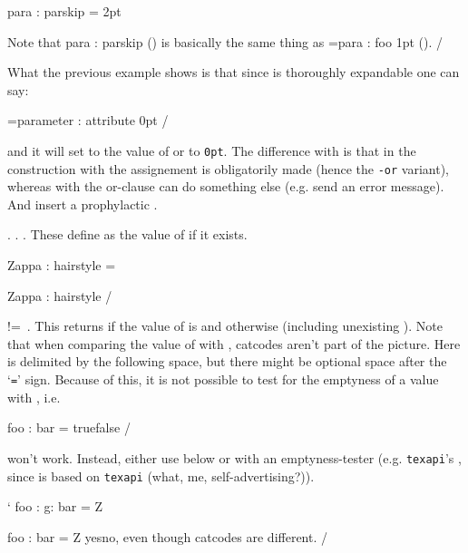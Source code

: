 \Example
\setparameter para  : parskip = 2pt \par
Note that 
\settovalueor\parskip para : parskip
                      {\parskip=1pt\relax}
(\the\parskip) is basically the same thing as
\parskip=\usevalueor para : foo {1pt\relax}
(\the\parskip).
\Example/

What the previous example shows is that since \com\usevalue
is thoroughly expandable one can say:

\example
\mydimen=\usevalueor parameter : attribute {0pt}
\example/

\noindent and it will set \com\mydimen to the value
of \paramatt or to \verb/0pt/. The difference with \com\settovalueor
is that in the construction with \com\usevalueor the assignement
is obligatorily made (hence the \verb/-or/ variant), whereas
with \com\settovalueor the or-clause can do something else
(e.g. send an error message). And \com\settovalue insert a
prophylactic \com\relax.




\describe*\storevalue\comarg\paramatt.
\describe\storevalueor\comarg\paramatt\orvalue.
\describe\storevalueand\comarg\paramatt\andvalue\orvalue.
These define \comarg as the value of \paramatt if it exists.

\Example
\setparameter Zappa : hairstyle = \moustache\par
\storevalue\beard Zappa : hairstyle
\meaning\beard
\Example/



\describe*!\ifvalue\paramatt=\value\ \true\false.
This returns \true if the value of \paramatt is \value
and \false otherwise (including unexisting \paramatt).
Note that when comparing the value of \paramatt with
\value, catcodes aren't part of the picture.
Here \value is delimited by the following space, but
there might be optional space after the `\verb/=/' sign.
Because of this, it is not possible to test for the
emptyness of a value with \com\ifvalue, i.e.

\example
\ifvalue foo : bar = {} {true}{false}
\example/

\noindent won't work. Instead, either use \com\ifcasevalue below or \com\passvalue
with an emptyness-tester (e.g. \verb/texapi/'s
\com\ifemptystring, since \yax is based on \verb/texapi/
(what, me, self-advertising?)).

\Example
\bgroup \catcode`
\setparameter foo : g: bar = Z \par
\egroup
\edef\foobar{%
  \ifvalue foo : bar = Z {yes}{no},
  even though catcodes are different.}
\meaning\foobar
\Example/



